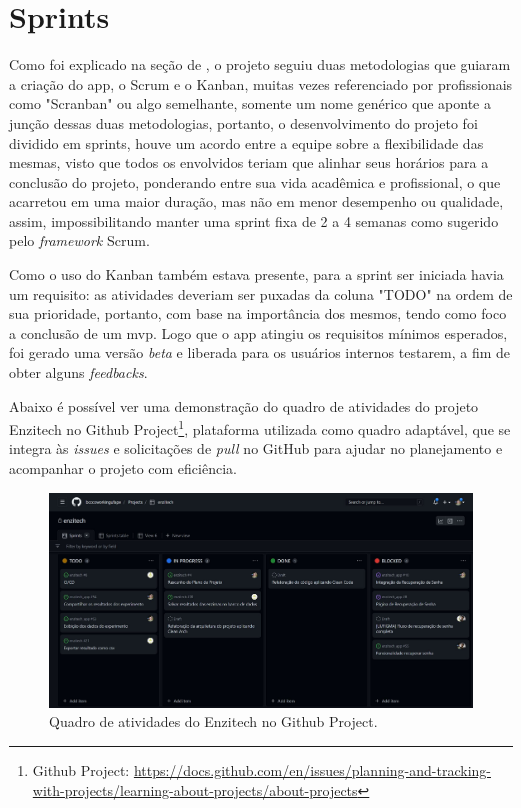 \section{Sprints}\label{sec:sprint}
Como foi explicado na seção de , o projeto seguiu duas metodologias que guiaram a criação do \ac{app}, o Scrum e o Kanban, muitas vezes referenciado por profissionais como "Scranban" ou algo semelhante, somente um nome genérico que aponte a junção dessas duas metodologias, portanto, o desenvolvimento do projeto foi dividido em sprints, houve um acordo entre a equipe sobre a flexibilidade das mesmas, visto que todos os envolvidos teriam que alinhar seus horários para a conclusão do projeto, ponderando entre sua vida acadêmica e profissional, o que acarretou em uma maior duração, mas não em menor desempenho ou qualidade, assim, impossibilitando manter uma sprint fixa de 2 a 4 semanas como sugerido pelo \textit{framework} Scrum. 

Como o uso do Kanban também estava presente, para a sprint ser iniciada havia um requisito: as atividades deveriam ser puxadas da coluna "TODO" na ordem de sua prioridade, portanto, com base na importância dos mesmos, tendo como foco a conclusão de um \ac{mvp}. Logo que o \ac{app} atingiu os requisitos mínimos esperados, foi gerado uma versão \textit{beta} e liberada para os usuários internos testarem, a fim de obter alguns \textit{feedbacks}.

Abaixo é possível ver uma demonstração do quadro de atividades do projeto Enzitech no Github Project\footnote{\label{githubproject}Github Project: \url{https://docs.github.com/en/issues/planning-and-tracking-with-projects/learning-about-projects/about-projects}}, plataforma utilizada como quadro adaptável, que se integra às \textit{issues} e solicitações de \textit{pull} no GitHub para ajudar no planejamento e acompanhar o projeto com eficiência.

\begin{figure}[H]
\centering
  \includegraphics[width=\columnwidth]{images/quadro_projeto_github.pdf}
  \caption{Quadro de atividades do Enzitech no Github Project.}
  \label{fig:quadro_projeto_github}
\end{figure}

